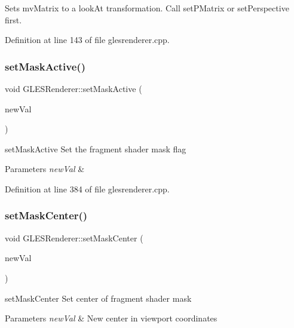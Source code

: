 Sets mv\+Matrix to a look\+At transformation. Call set\+P\+Matrix or set\+Perspective first. 

Definition at line 143 of file glesrenderer.\+cpp.

\mbox{\label{class_g_l_e_s_renderer_a957d299ae6eafc6604b5de598f525c6d}} 
\subsubsection{\texorpdfstring{setMaskActive()}{setMaskActive()}}
{\footnotesize\ttfamily void G\+L\+E\+S\+Renderer\+::set\+Mask\+Active (\begin{DoxyParamCaption}\item[{bool}]{new\+Val }\end{DoxyParamCaption})}



set\+Mask\+Active Set the fragment shader mask flag 


\begin{DoxyParams}{Parameters}
{\em new\+Val} & \\
\hline
\end{DoxyParams}


Definition at line 384 of file glesrenderer.\+cpp.

\mbox{\label{class_g_l_e_s_renderer_aa41f49d92c3514ce90a354cd2127d1c5}} 
\subsubsection{\texorpdfstring{setMaskCenter()}{setMaskCenter()}}
{\footnotesize\ttfamily void G\+L\+E\+S\+Renderer\+::set\+Mask\+Center (\begin{DoxyParamCaption}\item[{const Q\+Point \&}]{new\+Val }\end{DoxyParamCaption})}



set\+Mask\+Center Set center of fragment shader mask 


\begin{DoxyParams}{Parameters}
{\em new\+Val} & New center in viewport coordinates \\
\hline
\end{DoxyParams}



